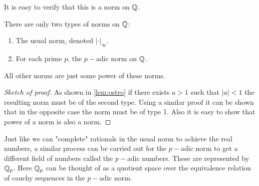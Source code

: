 \begin{observation}
  It is easy to verify that this is a norm on $\mathbb{Q}$.
\end{observation}
\begin{theorem}
  There are only two types of norms on $\mathbb{Q}$:
  \begin{enumerate}
    \item The usual norm, denoted $|\cdot|_\infty$.
    \item For each prime $p$, the $p-$adic norm on $\mathbb{Q}$.
  \end{enumerate}
  All other norms are just some power of these norms.
\end{theorem}
\begin{proof}[Sketch of proof]
  As shown in \cref{lem:ostro} if there exists $a>1$ such that $|a|<1$ the resulting norm must be of the second type. Using a similar proof it can be shown that in the opposite case the norm must be of type 1. Also it is easy to show that power of a norm is also a norm.
\end{proof}
\begin{remark}
  Just like we can "complete" rationals in the usual norm to achieve the real numbers, a similar process can be carried out for the $p-$adic norm to get a different field of numbers called the $p-$adic numbers. These are represented by $\mathbb{Q}_p$. Here $\mathbb{Q}_p$ can be thought of as a quotient space over the equivalence relation of cauchy sequences in the $p-$adic norm.
\end{remark}
